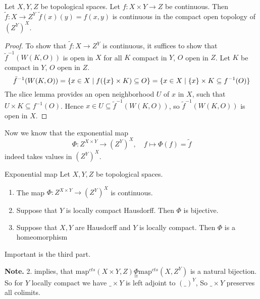 \documentclass[language=english]{TemplateLecture}
\begin{document}
\begin{proposition}
    Let \(X,Y,Z\) be topological spaces. Let \(f \colon X \times Y \to Z\) be continuous. Then \(\tilde f\colon X \to Z^Y\) \(\tilde f(x)(y) = f(x,y)\) is continuous in the compact open topology of \((Z^Y)^X\).
\end{proposition}

\begin{proof}
    To show that \(\tilde f\colon X \to Z^Y\) is continuous, it suffices to show that \(\tilde f^{-1}(W(K,O))\) is open in \(X\) for all \(K\) compact in \(Y\), \(O\) open in \(Z\). Let \(K\) be compact in \(Y\), \(O\) open in \(Z\).
    \[\tilde f^{-1}(W(K,O)) = \{x \in X\mid f(\{x\} \times K)\subseteq O\} = \{x \in X \mid \{x\} \times K \subseteq f^{-1}(O)\}\]
    The slice lemma provides an open neighborhood \(U\) of \(x\) in \(X\), such that \(U\times K \subseteq f^{-1}(O)\). Hence \(x \in U \subseteq \tilde f^{-1}(W(K,O))\), so \(\tilde f^{-1}(W(K,O))\) is open in \(X\).
\end{proof}

Now we know that the exponential map
\[\Phi\colon Z^{X\times Y} \to (Z^Y)^X, \quad f\mapsto \Phi(f) = \tilde f\]
indeed takes values in \((Z^Y)^X\).

\begin{thm}{Exponential map}{}
    Let \(X,Y,Z\) be topological spaces.
    \begin{enumerate}
        \item The map \(\Phi\colon Z^{X\times Y} \to (Z^Y)^X\) is continuous.
        \item Suppose that \(Y\) is locally compact Hausdorff. Then \(\Phi\) is bijective.
        \item Suppose that \(X, Y\) are Hausdorff and \(Y\) is locally compact. Then \(\Phi\) is a homeomorphism
    \end{enumerate}
\end{thm}

Important is the third part.

\textbf{Note.} 2. implies, that \(\mathrm{map}^{cts}(X\times Y, Z) \underset{\cong}{\Phi} \mathrm{map}^{cts}(X, Z^Y)\) is a natural bijection. So for \(Y\) locally compact we have \(\_\times Y\) is left adjoint to \((\_)^Y\), So \(\_\times Y\) preserves all colimits.
\end{document}
